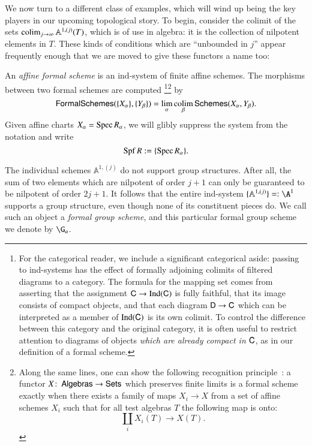 We now turn to a different class of examples, which will wind up being the key players in our upcoming topological story.  To begin, consider the colimit of the sets $\operatorname*{colim}_{j \to \infty} \mathbb A^{1,(j)}(T)$, which is of use in algebra: it is the collection of nilpotent elements in $T$.  These kinds of conditions which are ``unbounded in $j$'' appear frequently enough that we are moved to give these functors a name too:
\begin{definition}
An \textit{affine formal scheme} is an ind-system of finite affine schemes.  The morphisms between two formal schemes are computed%
\footnote{For the categorical reader, we include a significant categorical aside: passing to ind-systems has the effect of formally adjoining colimits of filtered diagrams to a category.  The formula for the mapping set comes from asserting that the assignment $\mathsf{C} \to \operatorname{Ind}(\mathsf{C})$ is fully faithful, that its image consists of compact objects, and that each diagram $\mathsf{D} \to \mathsf{C}$ which can be interpreted as a member of $\operatorname{Ind}(\mathsf{C})$ is its own colimit.  To control the difference between this category and the original category, it is often useful to restrict attention to diagrams of objects \emph{which are already compact in $\mathsf{C}$}, as in our definition of a formal scheme.}\footnote{Along the same lines, one can show the following recognition principle~\cite[Proposition 4.6]{StricklandFSFG}: a functor $X\colon\thinspace \mathsf{Algebras} \to \mathsf{Sets}$ which preserves finite limits is a formal scheme exactly when there exists a family of maps $X_i \to X$ from a set of affine schemes $X_i$ such that for all test algebras $T$ the following map is onto: \[\coprod_i X_i(T) \to X(T).\]}
by \[\mathsf{FormalSchemes}(\{X_\alpha\}, \{Y_\beta\}) = \lim_\alpha \operatorname*{colim}_\beta \mathsf{Schemes}(X_\alpha, Y_\beta).\]  Given affine charts $X_\alpha = \operatorname{Spec} R_\alpha$, we will glibly suppress the system from the notation and write \[\operatorname{Spf} R := \{\operatorname{Spec} R_\alpha\}.\]
\end{definition}

\begin{example}\label{FormalGaExample}
The individual schemes $\mathbb A^{1, (j)}$ do not support group structures.  After all, the sum of two elements which are nilpotent of order $j+1$ can only be guaranteed to be nilpotent of order $2j+1$.  It follows that the entire ind-system $\{\mathbb A^{1, (j)}\} =: \A^1$ supports a group structure, even though none of its constituent pieces do.  We call such an object a \textit{formal group scheme}, and this particular formal group scheme we denote by $\G_a$.
\end{example}

